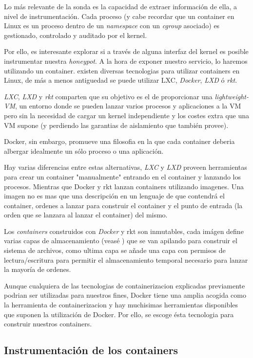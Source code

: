 Lo más relevante de la sonda es la capacidad de extraer información de ella, a nivel de instrumentación. Cada proceso (y cabe recordar que un container en Linux es un proceso dentro de un \emph{namespace} con un \emph{cgroup} asociado) es gestionado, controlado
y auditado por el kernel.

Por ello, es interesante explorar si a través de alguna interfaz del kernel es posible instrumentar nuestra \emph{honeypot}. A la hora de exponer nuestro servicio, lo haremos utilizando
un container. existen diversas tecnologias para utilizar containers en Linux, de más a menos antiguedad se puede utilizar LXC, \emph{Docker}, \emph{LXD} ó \emph{rkt}.

\emph{LXC}, \emph{LXD} y \emph{rkt} comparten que su objetivo es el de proporcionar una \emph{lightweight-VM}, un entorno donde se pueden lanzar varios procesos y aplicaciones a la VM
pero sin la necesidad de cargar un kernel independiente y los costes extra que una VM supone (y perdiendo las garantias de aislamiento que también provee).

Docker, sin embargo, promueve una filosofia en la que cada container deberia albergar idealmente un sólo proceso o una aplicación.

Hay varias diferencias entre estas alternativas, \emph{LXC} y \emph{LXD} proveen herramientas para crear un container "manualmente" entrando en el container y lanzando los procesos. Mientras que Docker y rkt
lanzan containers utilizando imagenes. Una imagen no es mas que una descripción en un lenguaje de que contendrá el container, ordenes a lanzar para construir el container y el punto de entrada (la orden que se lanzara al lanzar el container) del mismo.

Los \emph{containers} construidos con \emph{Docker} y rkt son inmutables, cada imágen define varias capas de almacenamiento (veasé \cite{docker-storage}) que se van apilando
para construir el sistema de archivos, como ultima capa se añade una capa con permisos de lectura/escritura para permitir el almacenamiento temporal necesario para lanzar
la mayoría de ordenes.

Aunque cualquiera de las tecnologias de containerizacion explicadas previamente podrian ser utilizadas para nuestros fines, Docker tiene una amplia acogida como la herramienta de containerizacion
y hay muchisimas herramientas disponibles que suponen la utilización de Docker. Por ello, se escoge ésta tecnologia para construir nuestros containers.

\subsection{Instrumentación de los containers}
\label{subsec:instrumentacion-containers}

